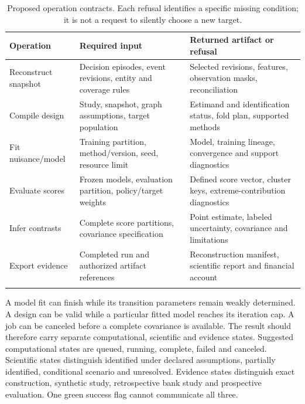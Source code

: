 \begin{longtable}{P{31mm}P{54mm}P{57mm}}
\toprule Operation & Required input & Returned artifact or refusal\\\midrule\endhead
Reconstruct snapshot & Decision episodes, event revisions, entity and coverage rules & Selected revisions, features, observation masks, reconciliation\\
Compile design & Study, snapshot, graph assumptions, target population & Estimand and identification status, fold plan, supported methods\\
Fit nuisance/model & Training partition, method/version, seed, resource limit & Model, training lineage, convergence and support diagnostics\\
Evaluate scores & Frozen models, evaluation partition, policy/target weights & Defined score vector, cluster keys, extreme-contribution diagnostics\\
Infer contrasts & Complete score partitions, covariance specification & Point estimate, labeled uncertainty, covariance and limitations\\
Export evidence & Completed run and authorized artifact references & Reconstruction manifest, scientific report and financial account\\
\bottomrule
\caption{Proposed operation contracts. Each refusal identifies a specific
missing condition; it is not a request to silently choose a new target.}
\label{tab:operations}
\end{longtable}

A model fit can finish while its transition parameters remain weakly
determined. A design can be valid while a particular fitted model reaches
its iteration cap. A job can be canceled before a complete covariance is
available. The result should therefore carry separate computational,
scientific and evidence states. Suggested computational states are queued,
running, complete, failed and canceled. Scientific states distinguish
identified under declared assumptions, partially identified, conditional
scenario and unresolved. Evidence states distinguish exact construction,
synthetic study, retrospective bank study and prospective evaluation.
One green success flag cannot communicate all three.

